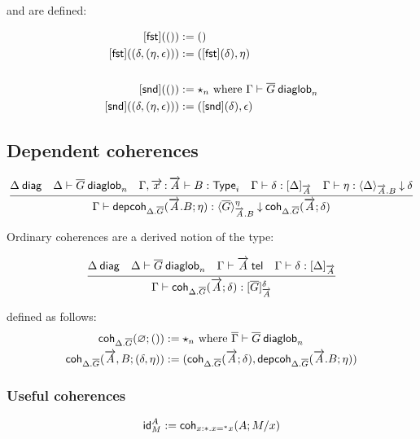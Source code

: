 and are defined:

\[\begin{aligned}
\mathsf{[fst]}(()) &:= () \\
\mathsf{[fst]}((\delta,(\eta,\epsilon))) &:=
(\mathsf{[fst]}(\delta),\eta) \\
&\\
\mathsf{[snd]}(()) &:= \mathbf{\star}_{n}
\text{ where ${\Gamma} \vdash {\ensuremath{\overline{G}}} \: \mathsf{diaglob}_{n}$} \\
\mathsf{[snd]}((\delta,(\eta,\epsilon))) &:=
(\mathsf{[snd]}(\delta),\epsilon) \\
\end{aligned}\]

\subsection{Dependent coherences}

\begin{small}
\[
\infer
  {\ofdepglob{\Gamma}{\depcoh{\Delta.\diag G}{\tel A.B}{\eta}}
    {\interpdepglob{\diag G}{\tel A.B}{\eta}}{\coh{\Delta.\diag
    G}{\tel A}{\delta}}}
  {\wfdiag{\Delta}
  &\wfdiaglob{\Delta}{\diag G}n
  &\wftype{\Gamma,\teltm xA}{B}
  &\ofinterp{\Gamma}{\delta}{\Delta}{\tel A}
  &\ofinterpdep{\Gamma}{\eta}{\Delta}{\tel A.B}{\delta}}
\]
\end{small}

Ordinary coherences are a derived notion of the type:
\begin{small}
  \[
  \infer{\ofglob{\Gamma}{\coh{{\Delta}.\diag{G}}{\tel A}{\delta}}
    {\interpglob{\diag{G}}{\tel A}{\delta}}}
  {\wfdiag{\Delta}
    & \wfdiaglob{\Delta}{\diag G}n
    & \wftel{\Gamma}{\tel A}
    & \ofinterp{\Gamma}{\delta}{\Delta}{\tel A}}
  \]
\end{small}

defined as follows:
\[\begin{aligned}
\mathsf{coh}_{{\Delta}.\overline{G}} ({\varnothing};{()}) &:=
\mathbf{\star}_{n}
\text{ where ${\overline{\Gamma}} \vdash {\ensuremath{\overline{G}}} \: \mathsf{diaglob}_{n}$} \\
\mathsf{coh}_{{\Delta}.\overline{G}} ({\overrightarrow{A},B};{(\delta,\eta)}) &:=
(\mathsf{coh}_{{\Delta}.\overline{G}} ({\overrightarrow{A}};{\delta}),
\mathsf{depcoh}_{{\Delta}.\overline{G}} ({\overrightarrow{A}.B};{\eta}))
\end{aligned}\]

\subsubsection{Useful coherences}

\[\mathsf{id}^{A}_{M}:=\mathsf{coh}_{x:\mathord{*}.x =^{\mathord{*}} x} ({A};{M/x})\]

